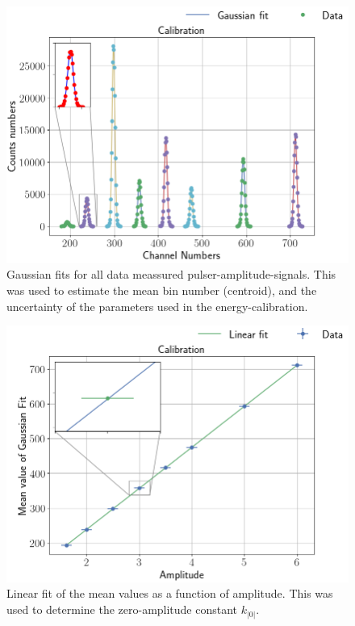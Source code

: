\begin{figure}[t]
\centering
\includegraphics[width=0.99\columnwidth]{gaussian_fit}
\caption{Gaussian fits for all data meassured pulser-amplitude-signals. This was used to estimate the mean
bin number (centroid), and the uncertainty of the parameters used in the
energy-calibration.}
\label{fig_gaussian_fit}
\end{figure}

\begin{figure}[t]
\centering
\includegraphics[width=0.99\columnwidth]{k0_plotting}
\caption{Linear fit of the mean values as a function of amplitude. This was
used to determine the zero-amplitude constant $k_|0|$.}
\label{fig_linear_fit}
\end{figure}

